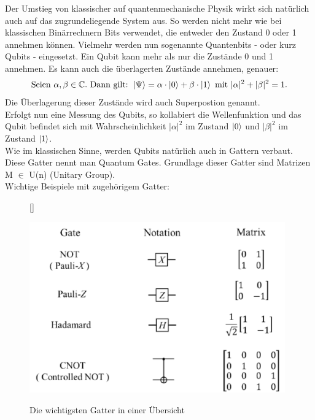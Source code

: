 Der Umstieg von klassischer auf quantenmechanische Physik wirkt sich natürlich auch auf das zugrundeliegende System aus. So werden nicht mehr wie bei klassischen Binärrechnern Bits verwendet, die entweder den Zustand 0 oder 1 annehmen können.
Vielmehr werden nun sogenannte Quantenbits - oder kurz Qubits - eingesetzt. Ein Qubit kann mehr als nur die Zustände 0 und 1 annehmen. Es kann auch die überlagerten Zustände annehmen, genauer\cite[Seite 20]{QuantumComputingHomeister}:
\begin{equation}
\text{Seien }\alpha, \beta \in \mathbb{C}.\text{ Dann gilt: }\ket{\Psi} = \alpha \cdot \ket{0} + \beta \cdot \ket{1} \text{ mit }|\alpha|^2 + |\beta|^2 = 1.
\end{equation}
Die Überlagerung dieser Zustände wird auch Superpostion genannt.\\
Erfolgt nun eine Messung des Qubits, so kollabiert die Wellenfunktion und das Qubit befindet sich mit Wahrscheinlichkeit \(|\alpha|^2\) im Zustand \(\ket{0}\) und \(|\beta|^2\) im Zustand \(\ket{1}\)\cite[Seite 20]{QuantumComputingHomeister}.\\

Wie im klassischen Sinne, werden Qubits natürlich auch in Gattern verbaut. Diese Gatter nennt man Quantum Gates. Grundlage dieser Gatter sind Matrizen M \(\in\) U(n) (Unitary Group).\\
\newpage
Wichtige Beispiele mit zugehörigem Gatter:\\
\begin{figure}[!htb]
[\FBwidth]
{\caption{Die wichtigsten Gatter in einer Übersicht \cite{Gates}}\label{fig:test}}
{\includegraphics[width=11cm]{QML/images/gates.pdf}}
\end{figure}\\


